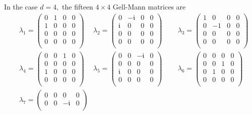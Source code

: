\documentclass[10pt,a4paper]{amsart}
\begin{document}
In the case $d=4,$ the fifteen $4 \times 4$ Gell-Mann matrices are
\begin{align*}
	&\lambda_1 = 
	\begin{pmatrix}
		0 & 1 & 0 & 0 \\
		1 & 0 & 0 & 0 \\
		0 & 0 & 0 & 0 \\
		0 & 0 & 0 & 0 \\
	\end{pmatrix}\quad \ 
	\lambda_2=
	\begin{pmatrix}
		0 & -\mathfrak{i} & 0 & 0 \\
		\mathfrak{i} & 0 & 0 & 0 \\
		0 & 0 & 0 & 0 \\
		0 & 0 & 0 & 0 \\
	\end{pmatrix}\quad \quad \,
	\lambda_3=
	\begin{pmatrix}
		1 & 0 & 0 & 0 \\
		0 & -1 & 0 & 0 \\
		0 & 0 & 0 & 0 \\
		0 & 0 & 0 & 0 \\
	\end{pmatrix}\\
	&\lambda_4=
	\begin{pmatrix}
		0 & 0 & 1 & 0 \\
		0 & 0 & 0 & 0 \\
		1 & 0 & 0 & 0 \\
		0 & 0 & 0 & 0 \\
	\end{pmatrix}\quad \ 
	\lambda_5=
	\begin{pmatrix}
		0 & 0 & -\mathfrak{i} & 0 \\
		0 & 0 & 0 & 0 \\
		\mathfrak{i} & 0 & 0 & 0 \\
		0 & 0 & 0 & 0 \\
	\end{pmatrix}\quad \quad \,
	\lambda_6=
	\begin{pmatrix}
		0 & 0 & 0 & 0 \\
		0 & 0 & 1 & 0 \\
		0 & 1 & 0 & 0 \\
		0 & 0 & 0 & 0 \\
	\end{pmatrix}\\
	&\lambda_7=
	\begin{pmatrix}
		0 & 0 & 0 & 0 \\
		0 & 0 & -\mathfrak{i} & 0 \\

\end{pmatrix}
\end{align*}
\end{document}
